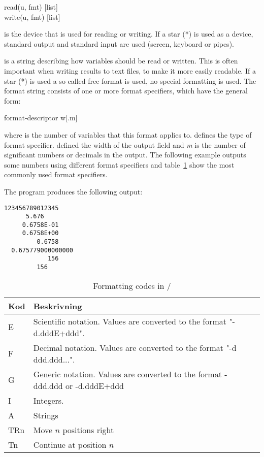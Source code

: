 \begin{fsyntax}
read(u, fmt) [list]\\
write(u, fmt) [list]
\end{fsyntax}

 is the device that is used for reading or writing. If a star (*) is used as a device, standard output and standard
input are used (screen, keyboard or pipes).

 is a string describing how variables should be read or written. This is often important when writing results to text files, to make it more easily readable. If a star (*) is used a so called free format is used, no special formatting is used. The format string consists of one or more format specifiers, which have the general form:

\begin{fsyntax}
 format-descriptor w[.m]
\end{fsyntax}

where  is the number of variables that this format applies to.  defines the type of format specifier.  defined the width of the output field and \textit{m} is the number of significant numbers or decimals in the output. The following example outputs some numbers using different format specifiers and table~\ref{table:formatkoder} show the most commonly used format specifiers.



The program produces the following output:

\begin{lstlisting}
123456789012345
      5.676
     0.6758E-01
     0.6758E+00
         0.6758
  0.675779000000000
            156
         156
\end{lstlisting}

\begin{table}
\begin{center}
\begin{tabular}{|l|l|}
\hline
Kod & Beskrivning \\
\hline
E   & Scientific notation. Values are converted to the format "-d.dddE+ddd". \\
F   & Decimal notation. Values are converted to the format "-d ddd.ddd...". \\
G   & Generic notation. Values are converted to the format -ddd.ddd or -d.dddE+ddd \\
I   & Integers. \\
A   & Strings \\
TRn & Move $n$ positions right \\
Tn  & Continue at position $n$ \\
\hline
\end{tabular}
\end{center}
\caption{Formatting codes in /}
\label{table:formatkoder}
\end{table}

